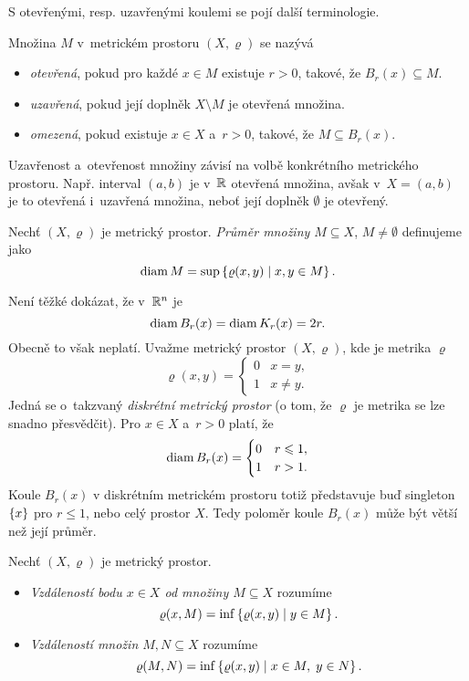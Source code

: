 S otevřenými, resp. uzavřenými koulemi se pojí další terminologie.
\begin{definition}\label{def:otevrena-uzavrena-omezena-mnozina}
     Množina $M$ v~metrickém prostoru $(X,\varrho)$ se nazývá
     \begin{itemize}
        \item \emph{otevřená}, pokud pro každé $x\in M$ existuje $r>0$, takové, že $B_r(x)\subseteq M$.
        \item \emph{uzavřená}, pokud její doplněk $X\setminus M$ je otevřená množina.
        \item \emph{omezená}, pokud existuje $x\in X$ a~$r>0$, takové, že $M\subseteq B_r(x)$.
     \end{itemize}
\end{definition}
Uzavřenost a~otevřenost množiny závisí na volbě konkrétního metrického prostoru. Např. interval $(a,b)$ je v~$\mathbb{R}$ otevřená množina, avšak v~$X=(a,b)$ je to otevřená i~uzavřená množina, neboť její doplněk $\emptyset$ je otevřený.
\begin{definition}\label{def:prumer-mnoziny}
    Nechť $(X,\varrho)$ je metrický prostor. \emph{Průměr množiny $M\subseteq X$}, $M\neq\emptyset$ definujeme jako
    \[\operatorname{diam}{M}=\sup\left\{\varrho(x,y)\mid x,y\in M\right\}.\]
\end{definition}
Není těžké dokázat, že v~$\mathbb{R}^n$ je
\[\operatorname{diam}{B_r(x)}=\operatorname{diam}{K_r(x)}=2r.\]
Obecně to však neplatí. Uvažme metrický prostor $(X,\varrho)$, kde je metrika $\varrho$
\[\varrho(x,y)=\begin{cases}
    0 & x=y,\\
    1 & x\neq y.
\end{cases}\]
Jedná se o~takzvaný \emph{diskrétní metrický prostor} (o tom, že $\varrho$ je metrika se lze snadno přesvědčit). Pro $x\in X$ a~$r>0$ platí, že
\[\operatorname{diam}{B_r(x)}=\begin{cases}
    0 & r\leqslant 1,\\
    1 & r>1.
\end{cases}\]
Koule $B_r(x)$ v diskrétním metrickém prostoru totiž představuje buď singleton $\left\{x\right\}$ pro $r\leqslant 1$, nebo celý prostor $X$. Tedy poloměr koule $B_r(x)$ může být větší než její průměr.

\begin{definition}\label{def:vzdalenost-bodu-od-mnoziny-vzdalenost-mnozin}
    Nechť $(X,\varrho)$ je metrický prostor.
    \begin{itemize}
        \item {}\emph{Vzdáleností bodu $x\in X$ od množiny $M\subseteq X$} rozumíme
        \[\varrho(x,M)=\inf\left\{\varrho(x,y)\mid y\in M\right\}.\]
        \item {}\emph{Vzdáleností množin $M,N\subseteq X$} rozumíme
        \[\varrho(M,N)=\inf\left\{\varrho(x,y)\mid x\in M,\;y\in N\right\}.\]
    \end{itemize}
\end{definition}

